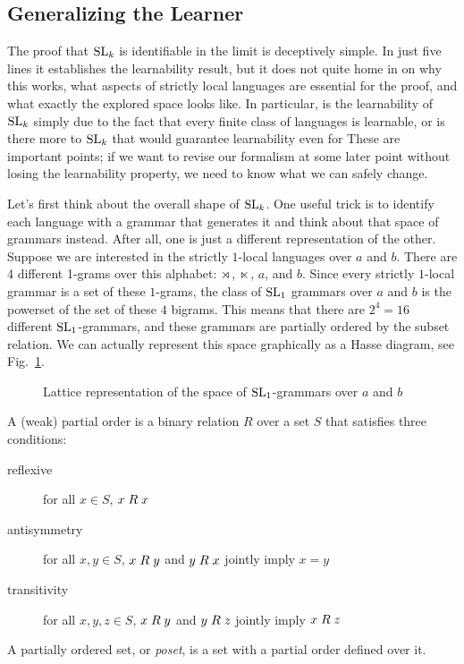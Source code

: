 \subsection{Generalizing the Learner}
The proof that $\SL_k$ is identifiable in the limit is deceptively simple.
In just five lines it establishes the learnability result, but it does not quite home in on why this works, what aspects of strictly local languages are essential for the proof, and what exactly the explored space looks like.
In particular, is the learnability of $\SL_k$ simply due to the fact that every finite class of languages is learnable, or is there more to $\SL_k$ that would guarantee learnability even for 
These are important points; if we want to revise our formalism at some later point without losing the learnability property, we need to know what we can safely change.

Let's first think about the overall shape of $\SL_k$.
One useful trick is to identify each language with a grammar that generates it and think about that space of grammars instead.
After all, one is just a different representation of the other.
Suppose we are interested in the strictly $1$-local languages over $a$ and $b$.
There are 4 different 1-grams over this alphabet: $\LeftEdge$, $\RightEdge$, $a$, and $b$. 
Since every strictly $1$-local grammar is a set of these $1$-grams, the class of $\SL_1$ grammars over $a$ and $b$ is the powerset of the set of these $4$ bigrams.
This means that there are $2^4 = 16$ different $\SL_1$-grammars, and these grammars are partially ordered by the subset relation.
We can actually represent this space graphically as a Hasse diagram, see Fig.~\ref{fig:LearnSL_SL1-Lattice}.
%
\begin{figure}[htpb]
    \centering
    
    \caption{Lattice representation of the space of $\SL_1$-grammars over $a$ and $b$}
    \label{fig:LearnSL_SL1-Lattice}
\end{figure}
%
\begin{techinfo}
    A (weak) partial order is a binary relation $R$ over a set $S$ that satisfies three conditions:
    \begin{description}
        \item[reflexive] for all $x \in S$, $\binrel{R}{x}{x}$
        \item[antisymmetry] for all $x, y \in S$, $\binrel{R}{x}{y}$ and $\binrel{R}{y}{x}$ jointly imply $x = y$
        \item[transitivity] for all $x, y, z \in S$, $\binrel{R}{x}{y}$ and $\binrel{R}{y}{z}$ jointly imply $\binrel{R}{x}{z}$
    \end{description}
    A partially ordered set, or \emph{poset}, is a set with a partial order defined over it.
\end{techinfo}

